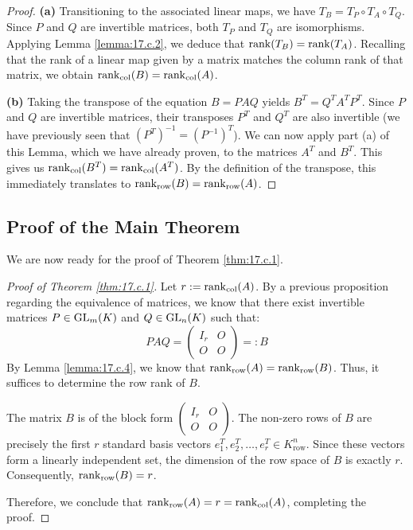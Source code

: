 \begin{proof}
\textbf{(a)} Transitioning to the associated linear maps, we have $T_B = T_P \circ T_A \circ T_Q$. Since $P$ and $Q$ are invertible matrices, both $T_P$ and $T_Q$ are isomorphisms. Applying Lemma \ref{lemma:17.c.2}, we deduce that $\operatorname{rank}(T_B) = \operatorname{rank}(T_A)$. Recalling that the rank of a linear map given by a matrix matches the column rank of that matrix, we obtain $\operatorname{rank}_{\text{col}}(B) = \operatorname{rank}_{\text{col}}(A)$.

\textbf{(b)} Taking the transpose of the equation $B = PAQ$ yields $B^T = Q^T A^T P^T$. Since $P$ and $Q$ are invertible matrices, their transposes $P^T$ and $Q^T$ are also invertible (we have previously seen that $(P^T)^{-1} = (P^{-1})^T$). We can now apply part (a) of this Lemma, which we have already proven, to the matrices $A^T$ and $B^T$. This gives us $\operatorname{rank}_{\text{col}}(B^T) = \operatorname{rank}_{\text{col}}(A^T)$. By the definition of the transpose, this immediately translates to $\operatorname{rank}_{\text{row}}(B) = \operatorname{rank}_{\text{row}}(A)$.
\end{proof}

\subsection{Proof of the Main Theorem}

We are now ready for the proof of Theorem \ref{thm:17.c.1}.

\begin{proof}[Proof of Theorem \ref{thm:17.c.1}]
Let $r := \operatorname{rank}_{\text{col}}(A)$. By a previous proposition regarding the equivalence of matrices, we know that there exist invertible matrices $P \in \operatorname{GL}_m(K)$ and $Q \in \operatorname{GL}_n(K)$ such that:
\begin{equation*}
    P A Q = \begin{pmatrix} I_r & O \\ O & O \end{pmatrix} =: B
\end{equation*}
By Lemma \ref{lemma:17.c.4}, we know that $\operatorname{rank}_{\text{row}}(A) = \operatorname{rank}_{\text{row}}(B)$. Thus, it suffices to determine the row rank of $B$.

The matrix $B$ is of the block form $\left(\begin{smallmatrix} I_r & O \\ O & O \end{smallmatrix}\right)$. The non-zero rows of $B$ are precisely the first $r$ standard basis vectors $e_1^T, e_2^T, \dots, e_r^T \in K_{\text{row}}^n$. Since these vectors form a linearly independent set, the dimension of the row space of $B$ is exactly $r$. Consequently, $\operatorname{rank}_{\text{row}}(B) = r$.

Therefore, we conclude that $\operatorname{rank}_{\text{row}}(A) = r = \operatorname{rank}_{\text{col}}(A)$, completing the proof.
\end{proof}